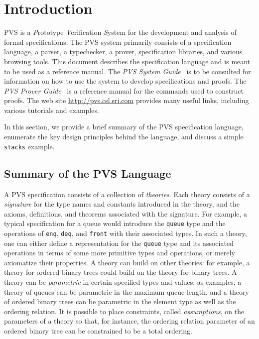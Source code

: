 
\chapter{Introduction}

PVS is a \emph{P}rototype \emph{V}erification \emph{S}ystem for the
development and analysis of formal specifications.  The PVS system
primarily consists of a specification language, a parser, a typechecker, a
prover, specification libraries, and various browsing tools.  This
document describes the specification language and is meant to be used as a
reference manual.  The \emph{PVS System Guide}~\cite{PVS:userguide} is to
be consulted for information on how to use the system to develop
specifications and proofs.  The \emph{PVS Prover Guide}~\cite{PVS:prover}
is a reference manual for the commands used to construct proofs.  The web
site \url{http://pvs.csl.sri.com} provides many useful links, including
various tutorials and examples.

In this section, we provide a brief summary of the PVS specification
language, enumerate the key design principles behind the language, and
discuss a simple \texttt{stacks} example.

\section{Summary of the PVS Language}

A PVS specification consists of a collection of \emph{theories}.
Each theory consists of a \emph{signature} for the type names and
constants introduced in the theory, and the axioms, definitions, and
theorems associated with the signature.  For example, a typical
specification for a queue would introduce the \texttt{queue} type and the
operations of \texttt{enq}, \texttt{deq}, and \texttt{front} with their
associated types.  In such a theory, one can either define a
representation for the \texttt{queue} type and its associated operations in
terms of some more primitive types and operations, or merely axiomatize
their properties.  A theory can build on other theories: for example, a
theory for ordered binary trees could build on the theory for
binary trees.  A theory can be \emph{parametric} in certain specified
types and values: as examples, a theory of queues can be parametric in
the maximum queue length, and a theory of ordered binary trees can be
parametric in the element type as well as the ordering relation.  It is
possible to place constraints, called \emph{assumptions}, on the
parameters of a theory so that, for instance, the ordering relation
parameter of an ordered binary tree can be constrained to be a total
ordering.

